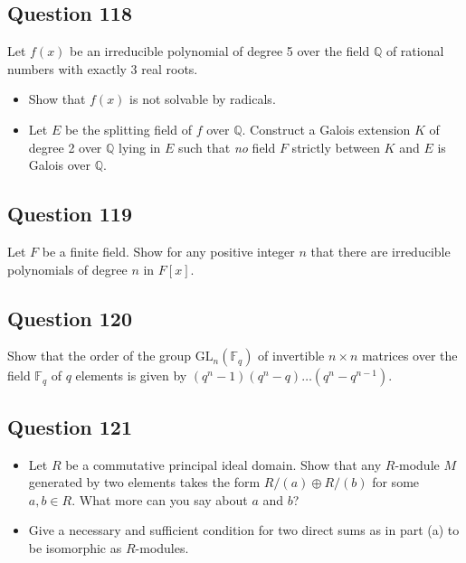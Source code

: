 \documentclass[12pt]{article}
\begin{document}
\hypertarget{question-118}{%
\subsection{Question 118}\label{question-118}}

Let \(f(x)\) be an irreducible polynomial of degree 5 over the field
\(\mathbb Q\) of rational numbers with exactly 3 real roots.

\begin{itemize}
\item
  Show that \(f(x)\) is not solvable by radicals.
\item
  Let \(E\) be the splitting field of \(f\) over \(\mathbb Q\).
  Construct a Galois extension \(K\) of degree 2 over \(\mathbb Q\)
  lying in \(E\) such that \textit{no} field \(F\) strictly between
  \(K\) and \(E\) is Galois over \(\mathbb Q\).
\end{itemize}

\hypertarget{question-119}{%
\subsection{Question 119}\label{question-119}}

Let \(F\) be a finite field. Show for any positive integer \(n\) that
there are irreducible polynomials of degree \(n\) in \(F[x]\).

\hypertarget{question-120}{%
\subsection{Question 120}\label{question-120}}

Show that the order of the group \(\text{GL}_n(\mathbb F_q)\) of
invertible \(n\times n\) matrices over the field \(\mathbb F_q\) of
\(q\) elements is given by \((q^n-1)(q^n-q)\dots(q^n-q^{n-1})\).

\hypertarget{question-121}{%
\subsection{Question 121}\label{question-121}}

\begin{itemize}
\item
  Let \(R\) be a commutative principal ideal domain. Show that any
  \(R\)-module \(M\) generated by two elements takes the form
  \(R/(a)\oplus R/(b)\) for some \(a,b\in R\). What more can you say
  about \(a\) and \(b\)?
\item
  Give a necessary and sufficient condition for two direct sums as in
  part (a) to be isomorphic as \(R\)-modules.
\end{itemize}
\end{document}
